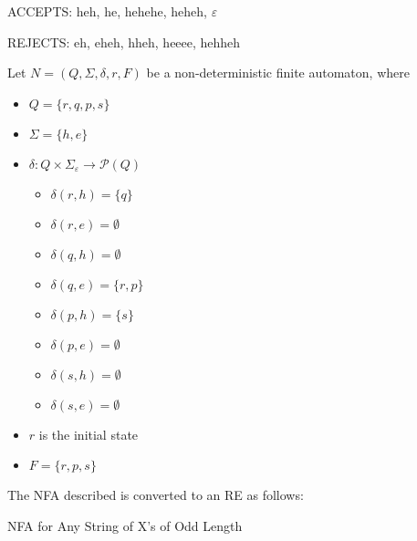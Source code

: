 \documentclass[11pt]{article}
\begin{document}
ACCEPTS: heh, he, hehehe, heheh, $\varepsilon$

REJECTS: eh, eheh, hheh, heeee, hehheh

Let $N=(Q,\Sigma,\delta,r,F)$ be a non-deterministic finite automaton, where

\begin{itemize}
	\item[] $Q = \{r, q, p, s\}$
	\item[] $\Sigma = \{h, e\}$
	\item[] $\delta : Q \times \Sigma_\varepsilon \to \mathcal{P}(Q)$
		\begin{itemize}
			\item[] $\delta(r,h)=\{q\}$
			\item[] $\delta(r,e)=\emptyset$
			\item[] $\delta(q,h)=\emptyset$
			\item[] $\delta(q,e)=\{r, p\}$
			\item[] $\delta(p,h)=\{s\}$
			\item[] $\delta(p,e)=\emptyset$
			\item[] $\delta(s,h)=\emptyset$
			\item[] $\delta(s,e)=\emptyset$
		\end{itemize}
	\item[] $r$ is the initial state
	\item[] $F = \{r, p, s\}$
\end{itemize}

\newpage
The NFA described is converted to an RE as follows:

NFA for Any String of X's of Odd Length
\end{document}

